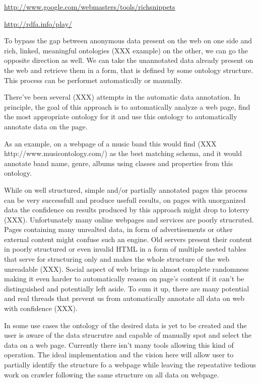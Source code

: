\url{http://www.google.com/webmasters/tools/richsnippets}

\url{http://rdfa.info/play/}

To bypass the gap between anonymous data present on the web on one side and
rich, linked, meaningful ontologies (XXX example) on the other, we can go the
opposite direction as well. We can take the unannotated data already present on
the web and retrieve them in a form, that is defined by some ontology
structure. This process can be performet automatically or manually. 

There've been several (XXX) attempts in the automatic data annotation. In
principle, the goal of this approach is to automatically analyze a web page,
find the most appropriate ontology for it and use this ontology to
automatically annotate data on the page. 

As an example, on a webpage of a music band this would find (XXX
http://www.musicontology.com/) as the best matching schema, and it would
annotate band name, genre, albums using classes and  properties from this ontology. 

While on well structured, simple and/or partially annotated pages this process
can be very successfull and produce usefull results, on pages with unorganized
data the confidence on results produced by this approach might drop to loterry (XXX). 
Unfortunately many online webpages and services are poorly strucruted. Pages
containing many unrealted data, in form of advertisements or other external
content might confuse such an engine. Old servers present their content in
poorly structured or even invalid HTML in a form of multiple nested tables that
serve for structuring only and makes the whole structure of the web unreadable
(XXX). Social aspect of web brings in almost complete randomness making it
even harder to automatically reason on page's content if it can't be
distinguished and potentially left aside. To sum it up, there are many
potential and real threads that prevent us from automatically annotate all data
on web with confidence (XXX). 

In some use cases the ontology of the desired data is yet to be created and the
user is aware of the data strucrutre and capable of manually spot and select
the data on a web page. Currently there isn't many tools allowing this kind of
operation. The ideal implementation and the vision here will allow user to
partially identify the structure fo a webpage while leaving the repeatative
tedious work on crawler following the same structure on all data on webpage. 

